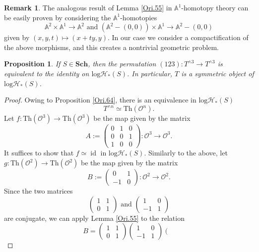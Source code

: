 \documentclass[11pt, a4paper]{amsart}
\newtheorem{prop}[thm]{Proposition}
\theoremstyle{definition}
\newtheorem{rmk}[thm]{Remark}
\numberwithin{equation}{subsection}
\newcommand{\A}{\mathbb{A}}
\newcommand{\Sch}{\mathbf{Sch}}
\newcommand{\id}{\operatorname{id}}   			%
\newcommand{\Thom}{\mathrm{Th}}
\newcommand{\cO}{\mathcal{O}}
\newcommand{\inflogHpt}{\mathrm{log}\mathcal{H}_\ast}
\begin{document}
\begin{rmk}
    The analogous result of   Lemma \ref{Ori.55} in $\A^1$-homotopy theory can be easily proven by considering the $\A^1$-homotopies
\[
\A^2\times \A^1\to \A^2
\text{ and }
(\A^2-(0,0))\times \A^1\to \A^2-(0,0)
\]
given by $(x,y,t)\mapsto (x+ty,y)$. In our case we consider a compactification of the above morphisms, and this creates a nontrivial geometric problem.
\end{rmk}

\begin{prop}
\label{Ori.56}
If $S\in \Sch$, 
then the permutation $(123)\colon T^{\wedge 3} \to T^{\wedge 3}$ is equivalent to the identity on $\inflogHpt(S)$. In particular, $T$ is a symmetric object of $\inflogHpt(S)$.
\end{prop}
\begin{proof}
Owing to Proposition \ref{Ori.64}, there is an equivalence in $\inflogHpt(S)$
\[
T^{\wedge n}
\simeq
\Thom(\cO^n).
\]
Let $f\colon \Thom(\cO^3)\to \Thom(\cO^3)$ be the map given by the matrix
\[
A:=\left(
\begin{array}{ccc}
0 & 1 & 0
\\
0 & 0 & 1
\\
1 & 0 & 0
\end{array}
\right)
\colon
\cO^3 \to \cO^3.
\]
It suffices to show that $f\simeq \id$ in $\inflogHpt(S)$.
Similarly to the above,
let $g\colon \Thom(\cO^2)\to \Thom(\cO^2)$ be the map given by the matrix
\[
B:=
\left(
\begin{array}{cc}
0 & 1
\\
-1 & 0
\end{array}
\right)
\colon 
\cO^2 \to \cO^2.
\]
Since the two matrices
\[
\left(
\begin{array}{cc}
1 & 1
\\
0 & 1
\end{array}
\right)
\text{ and }
\left(
\begin{array}{cc}
1 & 0
\\
-1 & 1
\end{array}
\right)
\]
are conjugate,
we can apply Lemma \ref{Ori.55}  to the relation
\[
B
=
\left(
\begin{array}{cc}
1 & 1
\\
0 & 1
\end{array}
\right)
\left(
\begin{array}{cc}
1 & 0
\\
-1 & 1
\end{array}
\right)
\left(
\begin{array}{cc}

\end{array}\]
\end{proof}
\end{document}
